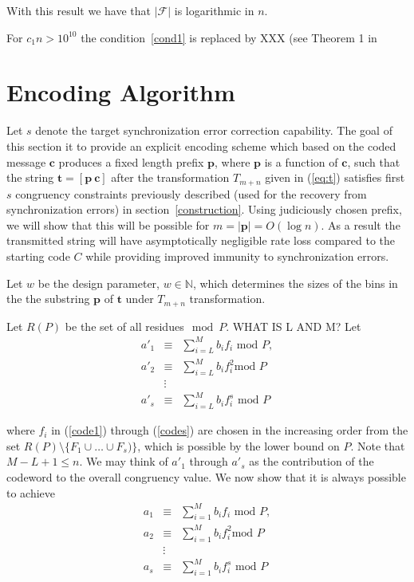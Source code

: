  With this result we have that
$|\mathcal{F}|$ is logarithmic in $n$.

For $c_1n>10^{10}$ the condition~\eqref{cond1} is replaced by XXX
(see Theorem 1 in \cite{rrumely}
\section{Encoding Algorithm}\label{enc}

Let $s$ denote the target synchronization error correction
capability. The goal of this section it to provide an explicit
encoding scheme which based on the coded message $\mathbf{c}$
produces a fixed length prefix $\mathbf{p}$, where $\mathbf{p}$ is
a function of $\mathbf{c}$, such that the string $\mathbf{t}=[
\mathbf{p} ~ \mathbf{c} ]$ after the transformation $T_{m+n}$
given in (\ref{eq:t}) satisfies first $s$ congruency constraints
previously described (used for the recovery from synchronization
errors) in section~\ref{construction}. Using judiciously chosen
prefix, we will show that this will be possible for
$m=|\mathbf{p}|=O(\log n)$. As a result the transmitted string
will have asymptotically negligible rate loss compared to the
starting code $C$ while providing improved immunity to
synchronization errors.

Let $w$ be the design parameter, $w \in \mathbb{N}$, which
determines the sizes of the bins in the the substring $\mathbf{p}$
of $\mathbf{t}$ under
$T_{m+n}$ transformation. %





Let $R(P)$ be the set of all residues$\mod P$. WHAT IS L AND M?
 Let
\begin{eqnarray}\label{code1} {a'}_1 &\equiv& \sum_{i=L}^M b_i f_i
\text{ mod } P, \\ {a'}_2 &\equiv& \sum_{i=L}^M b_i f_i^2 \text{
mod } P\\ &\vdots& \\
\label{codes}{a'}_s &\equiv& \sum_{i=L}^M b_i f_i^s \text{ mod }
P\end{eqnarray}

where $f_i$ in (\ref{code1}) through (\ref{codes}) are chosen in
the increasing order from the set $R(P)\setminus \{F_1 \cup \dots
\cup F_s) \}$, which is possible by the lower bound on $P$. Note
that $M-L+1 \leq n $. We may think of ${a'}_1$ through ${a'}_s$ as
the contribution of the codeword to the overall congruency value.
We now show that it is always possible to achieve
\begin{eqnarray}\label{s1} a_1 &\equiv& \sum_{i=1}^M b_i f_i
\text{ mod } P, \\ a_2 &\equiv& \sum_{i=1}^M b_i f_i^2 \text{
mod } P\\ &\vdots& \\
a_s &\equiv& \sum_{i=1}^M b_i f_i^s \text{ mod }
P\label{s2}\end{eqnarray}

